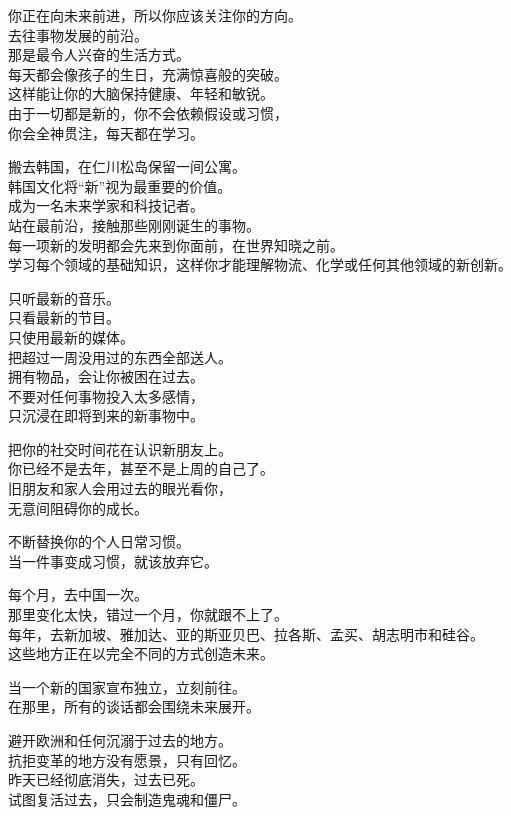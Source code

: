 \documentclass[
]{article}
\begin{document}
你正在向未来前进，所以你应该关注你的方向。\\
去往事物发展的前沿。\\
那是最令人兴奋的生活方式。\\
每天都会像孩子的生日，充满惊喜般的突破。\\
这样能让你的大脑保持健康、年轻和敏锐。\\
由于一切都是新的，你不会依赖假设或习惯，\\
你会全神贯注，每天都在学习。

搬去韩国，在仁川松岛保留一间公寓。\\
韩国文化将``新''视为最重要的价值。\\
成为一名未来学家和科技记者。\\
站在最前沿，接触那些刚刚诞生的事物。\\
每一项新的发明都会先来到你面前，在世界知晓之前。\\
学习每个领域的基础知识，这样你才能理解物流、化学或任何其他领域的新创新。

只听最新的音乐。\\
只看最新的节目。\\
只使用最新的媒体。\\
把超过一周没用过的东西全部送人。\\
拥有物品，会让你被困在过去。\\
不要对任何事物投入太多感情，\\
只沉浸在即将到来的新事物中。

把你的社交时间花在认识新朋友上。\\
你已经不是去年，甚至不是上周的自己了。\\
旧朋友和家人会用过去的眼光看你，\\
无意间阻碍你的成长。

不断替换你的个人日常习惯。\\
当一件事变成习惯，就该放弃它。

每个月，去中国一次。\\
那里变化太快，错过一个月，你就跟不上了。\\
每年，去新加坡、雅加达、亚的斯亚贝巴、拉各斯、孟买、胡志明市和硅谷。\\
这些地方正在以完全不同的方式创造未来。

当一个新的国家宣布独立，立刻前往。\\
在那里，所有的谈话都会围绕未来展开。

避开欧洲和任何沉溺于过去的地方。\\
抗拒变革的地方没有愿景，只有回忆。\\
昨天已经彻底消失，过去已死。\\
试图复活过去，只会制造鬼魂和僵尸。
\end{document}
